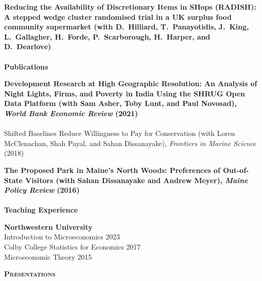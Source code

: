 \documentclass[11pt]{article}
\newcommand{\lineunder}{\vspace*{-8pt} \\ \hspace*{-18pt} \hrulefill \\}
\newcommand{\header}[1]{{\hspace*{-15pt}\vspace*{6pt} \textsc{#1}} \vspace*{-6pt} \lineunder}
\newcommand{\schoolwithcourses}[4]{
 \textbf{#1} \hfill{#2}\\
    #3\\
\vspace*{5pt}
}
\begin{document}
\schoolwithcourses{Reducing the Availability of Discretionary Items in SHops (RADISH): A stepped wedge cluster randomised trial in a UK surplus food community supermarket \textnormal{(with D.\ Hilliard, T.\ Panayotidis, J.\ King, L.\ Gallagher, H.\ Forde, P.\ Scarborough, H.\ Harper, and D.\ Dearlove)}}{}{}  



\header{\textbf{Publications}}
\schoolwithcourses{Development Research at High Geographic Resolution: An Analysis of Night Lights, Firms, and Poverty in India Using the SHRUG Open Data Platform \textnormal{(with Sam Asher, Toby Lunt, and Paul Novosad), \textit{World Bank Economic Review} (2021)}}{}{}  

\schoolwithcourses{Shifted Baselines Reduce Willingness to Pay for Conservation \textnormal{(with Loren McClenachan, Shah Payal, and Sahan Dissanayake), \textit{Frontiers in Marine Science} (2018)}}{}{} 

\schoolwithcourses{The Proposed Park in Maine's North Woods: Preferences of Out-of-State Visitors \textnormal{(with Sahan Dissanayake and Andrew Meyer), \textit{Maine Policy Review} (2016)}}{}{} 








\header{\textbf{Teaching Experience}}
\schoolwithcourses{Northwestern University}{}{\hspace{2mm} Introduction to Microeconomics \hfill 2023}

\schoolwithcourses{Colby College}{}{\hspace{2mm} Statistics for Economics \hfill 2017 \\ \hspace{2mm} Microeconomic Theory \hfill 2015}
\hfill{}


\header{\textbf{Presentations}}
\end{document}
